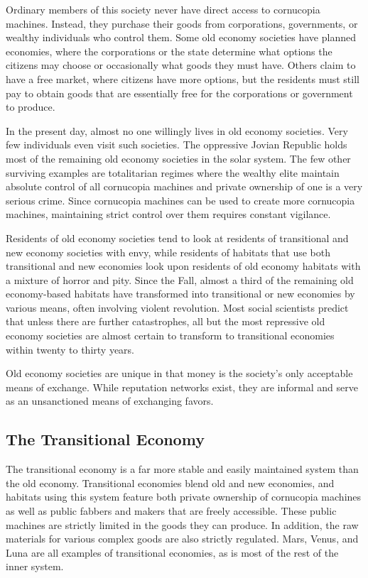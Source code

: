 Ordinary members of this society never have direct 
access to cornucopia machines. Instead, they purchase their goods from corporations, governments, 
or wealthy individuals who control them. Some old 
economy societies have planned economies, where the 
corporations or the state determine what options the 
citizens may choose or occasionally what goods they 
must have. Others claim to have a free market, where 
citizens have more options, but the residents must still 
pay to obtain goods that are essentially free for the 
corporations or government to produce.

In the present day, almost no one willingly lives in 
old economy societies. Very few individuals even visit 
such societies. The oppressive Jovian Republic holds 
most of the remaining old economy societies in the 
solar system. The few other surviving examples are 
totalitarian regimes where the wealthy elite maintain 
absolute control of all cornucopia machines and private ownership of one is a very serious crime. Since 
cornucopia machines can be used to create more 
cornucopia machines, maintaining strict control over 
them requires constant vigilance.

Residents of old economy societies tend to look at 
residents of transitional and new economy societies 
with envy, while residents of habitats that use both 
transitional and new economies look upon residents 
of old economy habitats with a mixture of horror and 
pity. Since the Fall, almost a third of the remaining 
old economy-based habitats have transformed into 
transitional or new economies by various means, 
often involving violent revolution. Most social scientists predict that unless there are further catastrophes, 
all but the most repressive old economy societies are 
almost certain to transform to transitional economies 
within twenty to thirty years.

Old economy societies are unique in that money is 
the society's only acceptable means of exchange. While 
reputation networks exist, they are informal and serve 
as an unsanctioned means of exchanging favors.

\subsection{The Transitional Economy}

The transitional economy is a far more stable and 
easily maintained system than the old economy. 
Transitional economies blend old and new economies, 
and habitats using this system feature both private 
ownership of cornucopia machines as well as public 
fabbers and makers that are freely accessible. These 
public machines are strictly limited in the goods they 
can produce. In addition, the raw materials for various complex goods are also strictly regulated. Mars, 
Venus, and Luna are all examples of transitional 
economies, as is most of the rest of the inner system.

